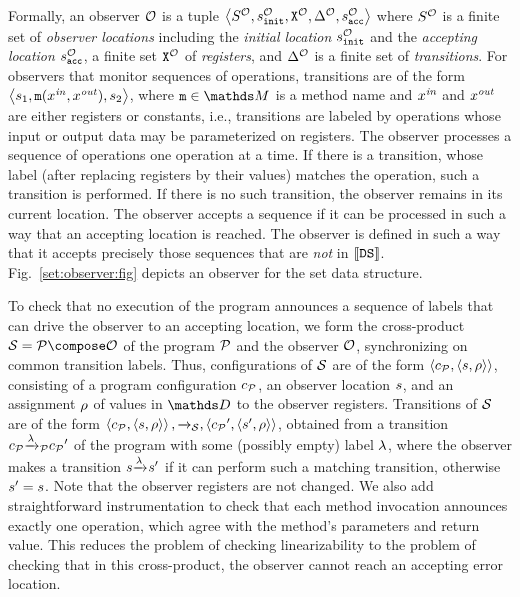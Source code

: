 Formally, an observer ${\mathcal O}$ is a tuple
$\left\langle S^{\mathcal O},s^{\mathcal O}_{\tt init},{\tt X}^{{\mathcal O}},\Delta^{\mathcal O},s^{\mathcal O}_{\tt acc}\right\rangle$ where $S^{\mathcal O}$ is a finite set 
of {\it observer locations} including the 
{\it initial location} $s^{\mathcal O}_{\tt init}$ and
the {\it accepting location} $s^{\mathcal O}_{\tt acc}$, 
a finite set ${\tt X}^{{\mathcal O}}$  
of {\it registers}, and $\Delta^{\mathcal O}$ is a finite
set of {\it transitions}.
%
%
For observers that monitor sequences of operations,
transitions are of the form 
$\left\langle s_1,{\tt m}(x^{\it in},x^{\it out}),s_2\right\rangle$,
where $\mname\in\malphabet$ is a method name and 
$x^{\it in}$ and $x^{\it out}$ are either registers or constants, i.e.,
transitions are labeled by 
operations whose input or output data may be parameterized on registers.
The observer processes a sequence of operations one operation at a time.
%
If there is a transition, whose label (after replacing registers by their
values) matches the operation, such a transition is performed. 
%
If there is no
such transition, the observer remains in its current location.
The observer accepts a sequence if it can  be processed in such a way that
an accepting location is reached.
%
The observer is defined in such a way that it accepts precisely those
sequences that are {\em not} in $\left\llbracket{{\tt DS}}\right\rrbracket$.
Fig.~\ref{set:observer:fig}
depicts an observer for the set data structure.

To check that no execution of the program announces a sequence of labels that
can drive the observer to an accepting location, we form
the cross-product $\system=\prog\compose\observer$ of the program ${\mathcal P}$
and the observer ${\mathcal O}$, synchronizing on common transition labels.
Thus, configurations of ${\mathcal S}$ are of the form
$\left\langle c_{{\mathcal P}},\left\langle s,\rho\right\rangle\right\rangle$, consisting of a program configuration
$c_{{\mathcal P}}$, an observer location $s$, and an assignment $\rho$ of values
in $\ddomain$ to the observer registers.
Transitions of ${\mathcal S}$ are of the form
$\left\langle c_{{\mathcal P}},\left\langle s,\rho\right\rangle\right\rangle,{\xrightarrow{}{}}_{\!\!{\mathcal S}},\left\langle{c_{{\mathcal P}}}',\left\langle s',\rho\right\rangle\right\rangle$,
obtained from a transition
$c_{{\mathcal P}} {\xrightarrow{\lambda}{}}_{\!\!{\mathcal P}} {c_{{\mathcal P}}}'$ of the program with some (possibly empty)
label $\lambda$, where the observer makes a transition
$s {\xrightarrow{\lambda}{}}_{\!\!} {s}'$ if it can perform such a matching
transition, otherwise $s' = s$.
Note that the observer registers are not changed.
We also add straightforward instrumentation to check that
each method invocation announces exactly one operation, which
agree with the method's parameters and return value.
This reduces the
problem of checking linearizability to the problem of checking that
in this cross-product, the observer cannot reach an accepting error location.

